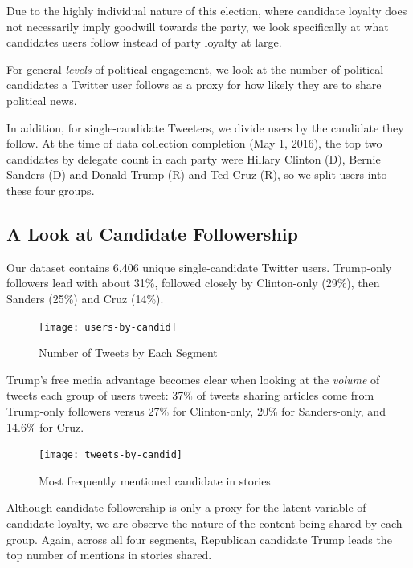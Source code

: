 Due to the highly individual nature of this election, where candidate loyalty does not necessarily imply goodwill towards the party, we look specifically at what candidates users follow instead of party loyalty at large. 

For general \emph{levels} of political engagement, we look at the number of political candidates a Twitter user follows as a proxy for how likely they are to share political news. 

In addition, for single-candidate Tweeters, we divide users by the candidate they follow. At the time of data collection completion (May 1, 2016), the top two candidates by delegate count in each party were Hillary Clinton (D), Bernie Sanders (D) and Donald Trump (R) and Ted Cruz (R), so we split users into these four groups. 


\subsection{A Look at Candidate Followership}

Our dataset contains 6,406 unique single-candidate Twitter users. Trump-only followers lead with about 31\%, followed closely by Clinton-only (29\%), then Sanders (25\%) and Cruz (14\%).


\begin{figure}[H]  
\centering 
  \texttt{[image: users-by-candid]}  
  \caption{Number of Tweets by Each Segment
    \label{fig:users-by-candid}}
\end{figure} 

 

Trump's free media advantage becomes clear when looking at the \emph{volume} of tweets each group of users tweet: 37\% of tweets sharing articles come from Trump-only followers versus 27\% for Clinton-only, 20\% for Sanders-only, and 14.6\% for Cruz.

\begin{figure}[H]  
\centering 
  \texttt{[image: tweets-by-candid]}  
  \caption{Most frequently mentioned candidate in stories
    \label{fig:tweets-by-candid}}
\end{figure} 

 


Although candidate-followership is only a proxy for the latent variable of candidate loyalty, we are observe the nature of the content being shared by each group. Again, across all four segments, Republican candidate Trump leads the top number of mentions in stories shared.

